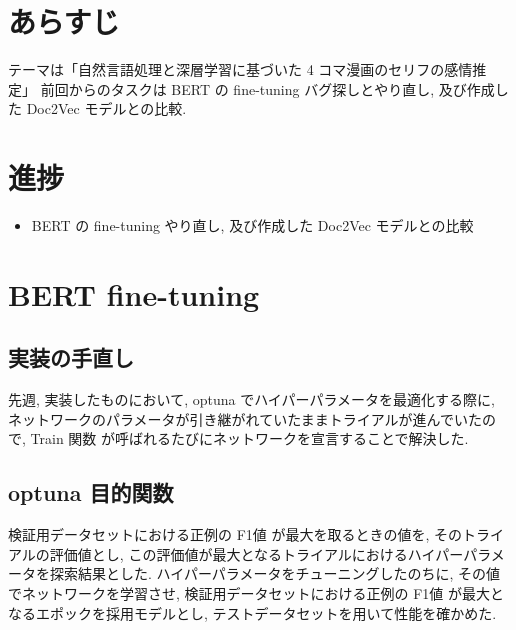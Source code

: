 \documentclass[twocolumn]{jarticle}     %
\begin{document}

\section{あらすじ}
テーマは「自然言語処理と深層学習に基づいた 4 コマ漫画のセリフの感情推定」
前回からのタスクは BERT\cite{BERT} の fine-tuning バグ探しとやり直し, 及び作成した Doc2Vec モデルとの比較.

\section{進捗}

\begin{itemize}
  \item BERT の fine-tuning やり直し, 及び作成した Doc2Vec モデルとの比較
\end{itemize}

\section{BERT fine-tuning}

\subsection{実装の手直し}
先週, 実装したものにおいて, optuna でハイパーパラメータを最適化する際に, ネットワークのパラメータが引き継がれていたままトライアルが進んでいたので, Train 関数
が呼ばれるたびにネットワークを宣言することで解決した.

\subsection{optuna 目的関数}
検証用データセットにおける正例の F1値 が最大を取るときの値を, そのトライアルの評価値とし, この評価値が最大となるトライアルにおけるハイパーパラメータを探索結果とした.
ハイパーパラメータをチューニングしたのちに, その値でネットワークを学習させ, 検証用データセットにおける正例の F1値 が最大となるエポックを採用モデルとし, テストデータセットを用いて性能を確かめた.
\end{document}
